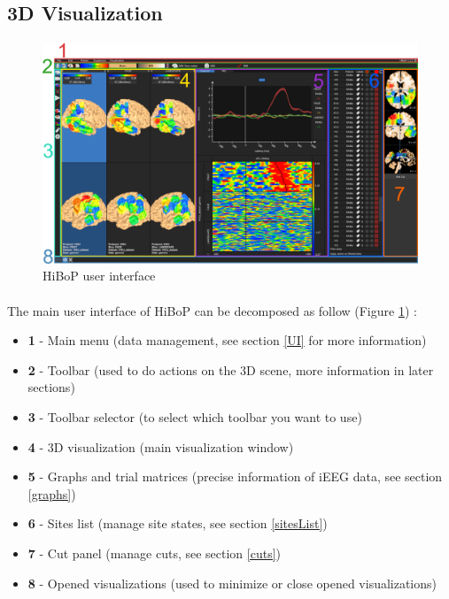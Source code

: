 \documentclass[a4paper]{article}
\begin{document}
\subsection{3D Visualization}
\paragraph{}
\begin{figure}[H]
\begin{center}
\includegraphics[scale=0.22]{GlobalUI.png}
\end{center}
\caption{\label{globalUI}HiBoP user interface}
\end{figure}
\paragraph{} The main user interface of HiBoP can be decomposed as follow (Figure \ref{globalUI}) :
\begin{itemize}
\item \textbf{1} - Main menu (data management, see section \ref{UI} for more information)
\item \textbf{2} - Toolbar (used to do actions on the 3D scene, more information in later sections)
\item \textbf{3} - Toolbar selector (to select which toolbar you want to use)
\item \textbf{4} - 3D visualization (main visualization window)
\item \textbf{5} - Graphs and trial matrices (precise information of iEEG data, see section \ref{graphs})
\item \textbf{6} - Sites list (manage site states, see section \ref{sitesList})
\item \textbf{7} - Cut panel (manage cuts, see section \ref{cuts})
\item \textbf{8} - Opened visualizations (used to minimize or close opened visualizations)
\end{itemize}
\end{document}
